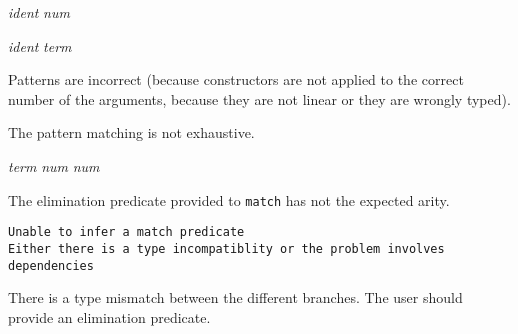 \begin{ErrMsgs}
\item {} {\sl
    ident}  {\sl num} 

  {\sl ident}  {\sl term}

  {\term}
  {\term} 

 Patterns are incorrect (because constructors are not applied to
  the correct number of the arguments, because they are not linear or
  they are wrongly typed).

\item {}

The pattern matching is not exhaustive.

\item {} {\sl term}  {\sl num}  {\sl
    num} 

The elimination predicate provided to \texttt{match} has not the
  expected arity.





\item {\tt Unable to infer a match predicate\\
    Either there is a type incompatiblity or the problem involves\\
    dependencies}

  There is a type mismatch between the different branches.
  The user should provide an elimination predicate.


\end{ErrMsgs}
